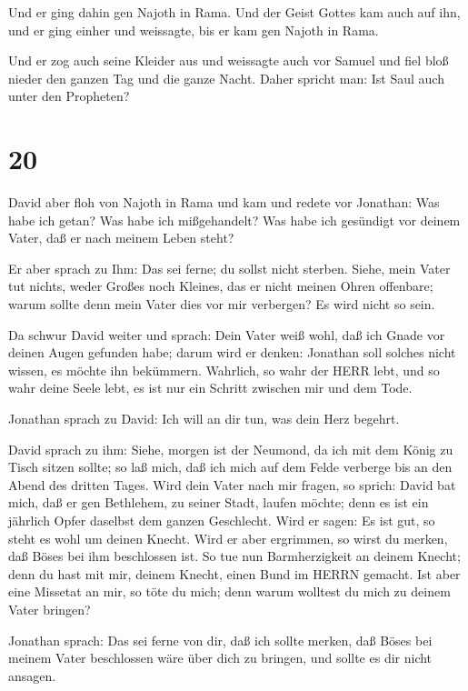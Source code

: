  Und er ging dahin gen Najoth in Rama. Und der Geist Gottes
kam auch auf ihn, und er ging einher und weissagte, bis er kam gen
Najoth in Rama.

 Und er zog auch seine Kleider aus und weissagte auch vor
Samuel und fiel bloß nieder den ganzen Tag und die ganze Nacht. Daher
spricht man: Ist Saul auch unter den Propheten?

\hypertarget{section-19}{%
\section{20}\label{section-19}}

 David aber floh von Najoth in Rama und kam und redete vor
Jonathan: Was habe ich getan? Was habe ich mißgehandelt? Was habe ich
gesündigt vor deinem Vater, daß er nach meinem Leben steht?

 Er aber sprach zu Ihm: Das sei ferne; du sollst nicht
sterben. Siehe, mein Vater tut nichts, weder Großes noch Kleines, das er
nicht meinen Ohren offenbare; warum sollte denn mein Vater dies vor mir
verbergen? Es wird nicht so sein.

 Da schwur David weiter und sprach: Dein Vater weiß wohl,
daß ich Gnade vor deinen Augen gefunden habe; darum wird er denken:
Jonathan soll solches nicht wissen, es möchte ihn bekümmern. Wahrlich,
so wahr der HERR lebt, und so wahr deine Seele lebt, es ist nur ein
Schritt zwischen mir und dem Tode.

 Jonathan sprach zu David: Ich will an dir tun, was dein
Herz begehrt.

 David sprach zu ihm: Siehe, morgen ist der Neumond, da ich
mit dem König zu Tisch sitzen sollte; so laß mich, daß ich mich auf dem
Felde verberge bis an den Abend des dritten Tages.  Wird
dein Vater nach mir fragen, so sprich: David bat mich, daß er gen
Bethlehem, zu seiner Stadt, laufen möchte; denn es ist ein jährlich
Opfer daselbst dem ganzen Geschlecht.  Wird er sagen: Es ist
gut, so steht es wohl um deinen Knecht. Wird er aber ergrimmen, so wirst
du merken, daß Böses bei ihm beschlossen ist.  So tue nun
Barmherzigkeit an deinem Knecht; denn du hast mit mir, deinem Knecht,
einen Bund im HERRN gemacht. Ist aber eine Missetat an mir, so töte du
mich; denn warum wolltest du mich zu deinem Vater bringen?

 Jonathan sprach: Das sei ferne von dir, daß ich sollte
merken, daß Böses bei meinem Vater beschlossen wäre über dich zu
bringen, und sollte es dir nicht ansagen.

